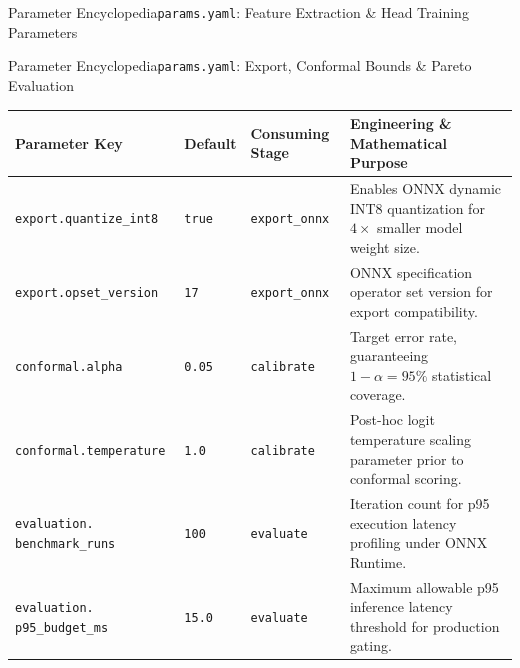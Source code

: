 \begin{frame}{Parameter Encyclopedia}{\texttt{params.yaml}: Feature Extraction \& Head Training Parameters}
\end{frame}

\begin{frame}{Parameter Encyclopedia}{\texttt{params.yaml}: Export, Conformal Bounds \& Pareto Evaluation}
    \vspace{-0.25cm}
    \begin{center}\scriptsize\renewcommand{\arraystretch}{0.76}
        \begin{tabular}{>{\raggedright\arraybackslash}p{3.5cm} >{\centering\arraybackslash}p{1.0cm} >{\raggedright\arraybackslash}p{2.0cm} >{\raggedright\arraybackslash}p{4.9cm}}
            \toprule
            \textbf{Parameter Key} & \textbf{Default} & \textbf{Consuming Stage} & \textbf{Engineering \& Mathematical Purpose} \\
            \midrule
            \texttt{export.quantize\_int8} & \texttt{true} & \texttt{export\_onnx} & Enables ONNX dynamic INT8 quantization for $4\times$ smaller model weight size. \\
            \texttt{export.opset\_version} & \texttt{17} & \texttt{export\_onnx} & ONNX specification operator set version for export compatibility. \\
            \texttt{conformal.alpha} & \texttt{0.05} & \texttt{calibrate} & Target error rate, guaranteeing $1 - \alpha = 95\%$ statistical coverage. \\
            \texttt{conformal.temperature} & \texttt{1.0} & \texttt{calibrate} & Post-hoc logit temperature scaling parameter prior to conformal scoring. \\
            \texttt{evaluation.} \newline \texttt{benchmark\_runs} & \texttt{100} & \texttt{evaluate} & Iteration count for p95 execution latency profiling under ONNX Runtime. \\
            \texttt{evaluation.} \newline \texttt{p95\_budget\_ms} & \texttt{15.0} & \texttt{evaluate} & Maximum allowable p95 inference latency threshold for production gating. \\
            \bottomrule
        \end{tabular}
    \end{center}


\end{frame}

